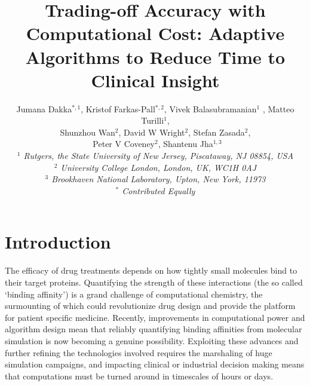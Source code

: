 \documentclass[conference]{IEEEtran}
\begin{document}


\title{Trading-off Accuracy with Computational Cost: Adaptive Algorithms to Reduce Time to Clinical Insight}




\author{Jumana Dakka$^{*,1}$, Kristof Farkas-Pall$^{*,2}$, Vivek Balasubramanian$^{1}$ , Matteo Turilli$^{1}$, \\
 Shunzhou Wan$^{2}$, David W Wright$^{2}$, Stefan Zasada$^{2}$, \\\
 Peter V Coveney$^{2}$, Shantenu Jha$^{1,3}$ \\

  \small{\emph{$^{1}$ Rutgers, the State University of New Jersey, Piscataway, NJ 08854, USA}}\\
   \small{\emph{$^{2}$ University College London, London, UK, WC1H 0AJ}}\\
   \small{\emph{$^{3}$ Brookhaven National Laboratory, Upton, New York, 11973}}\\
   \small{\emph{$^{*}$ Contributed Equally}}
}


\date{}
\maketitle

\begin{abstract}

\end{abstract}


\section{Introduction}\label{sec:intro}

The efficacy of drug treatments depends on how tightly small molecules bind to their target proteins. Quantifying the strength of these interactions (the so called ‘binding affinity’) is a grand challenge of computational chemistry, the surmounting of which could revolutionize drug design and provide the platform for patient specific medicine. Recently, improvements in computational power and algorithm design mean that reliably quantifying binding affinities from molecular simulation is now becoming a genuine possibility. Exploiting these advances and further refining the technologies involved requires the marshaling of huge simulation campaigns, and impacting clinical or industrial decision making means that computations must be turned around in timescales of hours or days.
\end{document}
